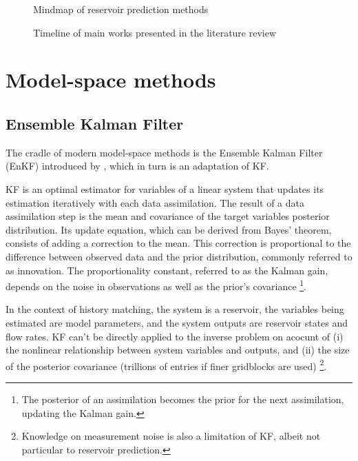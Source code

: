 \begin{figure}[htbp]
    \centering
    \caption{Mindmap of reservoir prediction methods}
    \label{fig:graph-literature}
    \scalebox{0.9}{%
        
    }
\end{figure}

\begin{figure}[htbp]
    \centering
    \caption{Timeline of main works presented in the literature review}
    \label{fig:timeline-literature}
    \scalebox{1.0}{%
        
    }
\end{figure}

\section{Model-space methods}
\label{sec:model-space-methods}

\subsection{Ensemble Kalman Filter}

The cradle of modern model-space methods is the Ensemble Kalman Filter (EnKF)
introduced by , which in turn is an adaptation of KF.

KF is an optimal estimator for variables of a linear system \cite[section 4.1]{Emerick:2025}
that updates its estimation iteratively with each data assimilation.
%
The result of a data assimilation step is the mean and covariance of the target variables posterior distribution.
%
Its update equation, which can be derived from Bayes' theorem, 
consists of adding a correction to the mean.
%
This correction is proportional to the difference
between observed data and the prior distribution, commonly referred to as innovation.
%
The proportionality constant, referred to as the Kalman gain, 
depends on the noise in observations as well as the prior's covariance%
\footnote{%
    The posterior of an assimilation becomes the prior for the next assimilation,
    updating the Kalman gain.
}.

In the context of history matching, 
the system is a reservoir, 
the variables being estimated are model parameters,
and the system outputs are reservoir states and flow rates.
%
KF can't be directly applied to the inverse problem on acocunt of 
(i) the nonlinear relationship between system variables and outputs, and 
(ii) the size of the posterior covariance (trillions of entries if finer gridblocks are used)%
\footnote{%
    Knowledge on measurement noise is also a limitation of KF, albeit not particular to reservoir prediction.
}.

